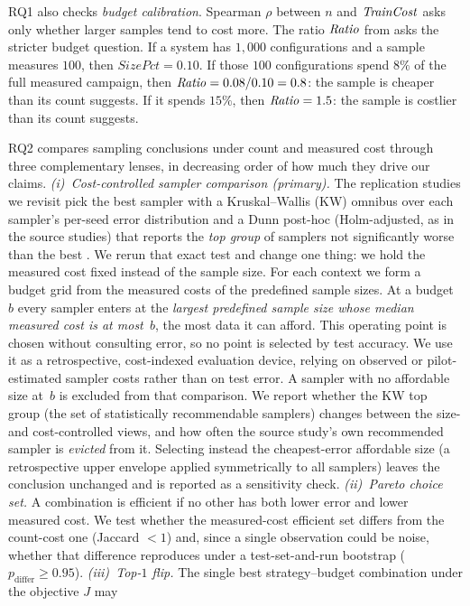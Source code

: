 RQ1 also checks \emph{budget calibration}. Spearman $\rho$ between $n$ and
$\mathit{TrainCost}$ asks only whether larger samples tend to cost more. The ratio
$\mathit{Ratio}$ from  asks the stricter budget question. If a system has
$1{,}000$ configurations and a sample measures $100$, then $\mathit{SizePct}=0.10$.
If those $100$ configurations spend $8\%$ of the full measured campaign, then
$\mathit{Ratio}=0.08/0.10=0.8$: the sample is cheaper than its count suggests. If it
spends $15\%$, then $\mathit{Ratio}=1.5$: the sample is costlier than its count
suggests.

RQ2 compares sampling conclusions under count and measured cost through three
complementary lenses, in decreasing order of how much they drive our claims.
\emph{(i)~Cost-controlled sampler comparison (primary).} The replication studies
we revisit pick the best sampler with a Kruskal--Wallis (KW) omnibus over each
sampler's per-seed error distribution and a Dunn post-hoc (Holm-adjusted, as in
the source studies) that reports the \emph{top group} of samplers not
significantly worse than the best
\cite{kruskal1952,kaltenecker2019,pereira2020}. We rerun that exact test and
change one thing: we hold the measured cost fixed instead of the
sample size. For each context we form a budget grid from the measured costs of
the predefined sample sizes. At a budget $b$ every sampler enters at the
\emph{largest predefined sample size whose median measured cost is at most~$b$},
the most data it can afford. This operating point is chosen without consulting
error, so no point is selected by test accuracy. We use it as a retrospective,
cost-indexed evaluation device, relying on observed or pilot-estimated sampler
costs rather than on test error. A sampler with no affordable size at~$b$ is excluded from
that comparison. We report whether the KW top group (the set of statistically
recommendable samplers) changes between the size- and cost-controlled views, and
how often the source study's own recommended sampler is \emph{evicted} from it.
Selecting instead the cheapest-error affordable size (a retrospective upper
envelope applied symmetrically to all samplers) leaves the conclusion unchanged
and is reported as a sensitivity check.
\emph{(ii)~Pareto choice set.} A combination is efficient if no other has both
lower error and lower measured cost. We test whether the measured-cost efficient
set differs from the count-cost one (Jaccard $<1$) and, since a single
observation could be noise, whether that difference reproduces under a
test-set-and-run bootstrap ($p_{\text{differ}}\ge0.95$). \emph{(iii)~Top-$1$
flip.} The single best strategy--budget combination under the objective $J$ may
